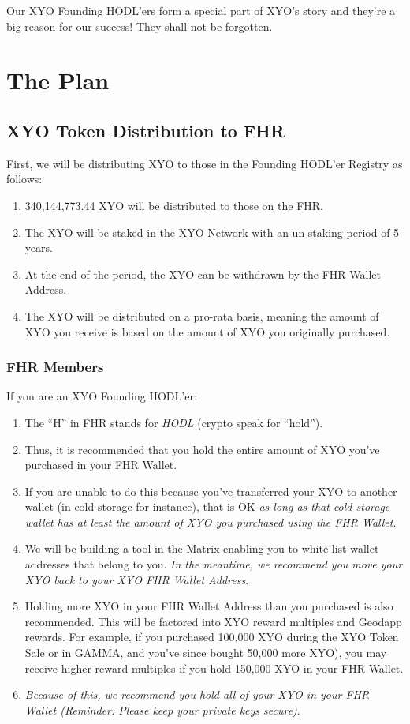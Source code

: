 \documentclass{article}
\begin{document}
Our XYO Founding HODL'ers form a special part of XYO's story and they're a big reason for our success! They shall not be forgotten.

\section{The Plan}

\subsection{XYO Token Distribution to FHR}

First, we will be distributing XYO to those in the Founding HODL'er Registry as follows:

\begin{enumerate}
\item 340,144,773.44 XYO will be distributed to those on the FHR. 
\item The XYO will be staked in the XYO Network with an un-staking period of 5 years. 	
\item At the end of the period, the XYO can be withdrawn by the FHR Wallet Address. 
\item The XYO will be distributed on a pro-rata basis, meaning the amount of XYO you receive is based on the amount of XYO you originally purchased.
\end{enumerate}

\subsubsection{FHR Members}

If you are an XYO Founding HODL'er:

\begin{enumerate}
  \item The ``H'' in FHR stands for \textit{HODL} (crypto speak for ``hold'').
  \item Thus, it is recommended that you hold the entire amount of XYO you've purchased in your FHR Wallet.
  \item If you are unable to do this because you've transferred your XYO to another wallet (in cold storage for instance), that is OK \textit{as long as that cold storage wallet has at least the amount of XYO you purchased using the FHR Wallet}.
  \item We will be building a tool in the Matrix enabling you to white list wallet addresses that belong to you. \textit{In the meantime, we recommend you move your XYO back to your XYO FHR Wallet Address}.
  \item Holding more XYO in your FHR Wallet Address than you purchased is also recommended. This will be factored into XYO reward multiples and Geodapp rewards. For example, if you purchased 100,000 XYO during the XYO Token Sale or in GAMMA, and you've since bought 50,000 more XYO), you may receive higher reward multiples if you hold 150,000 XYO in your FHR Wallet.
  \item \textit{Because of this, we recommend you hold all of your XYO in your FHR Wallet (Reminder: Please keep your private keys secure)}.
\end{enumerate}
\end{document}
